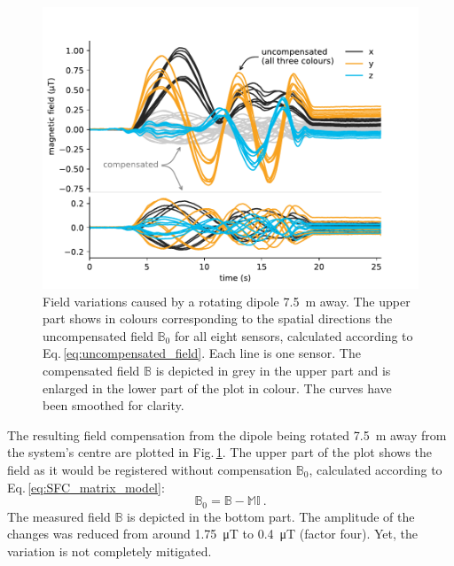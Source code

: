 \begin{figure}
  \centering
  \includegraphics[width=\linewidth]{gfx/prototype/compensated_7_5m_double.pdf}
  \caption{Field variations caused by a rotating dipole \SI{7.5}{\meter} away.
  The upper part shows in colours corresponding to the spatial directions the uncompensated field $\mathbb{B}_0$ for all eight sensors, calculated according to Eq.\,\ref{eq:uncompensated_field}. Each line is one sensor. The compensated field $\mathbb{B}$ is depicted in grey in the upper part and is enlarged in the lower part of the plot in colour. The curves have been smoothed for clarity.}\label{fig:prototype_compensation_time}
\end{figure}

The resulting field compensation from the dipole being rotated \SI{7.5}{\meter} away from the system's centre are plotted in Fig.\,\ref{fig:prototype_compensation_time}. The upper part of the plot shows the field as it would be registered without compensation $\mathbb{B}_0$, calculated according to Eq.\,\ref{eq:SFC_matrix_model}:
\begin{equation}
  \label{eq:uncompensated_field}
  \mathbb{B}_0 = \mathbb{B} - \mathbb{M} \mathbb{I} \ .
\end{equation}
The measured field $\mathbb{B}$ is depicted in the bottom part.
The amplitude of the changes was reduced from around \SI{1.75}{\micro\tesla} to \SI{0.4}{\micro\tesla} (factor four).
Yet, the variation is not completely mitigated.


